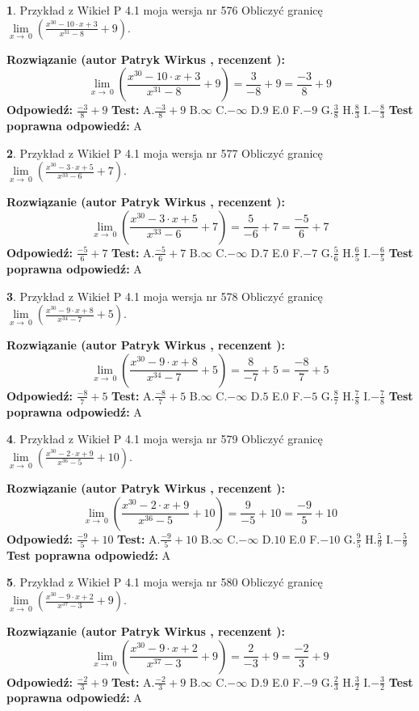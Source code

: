 \documentclass[12pt, a4paper]{article}
\theoremstyle{definition} %
\newtheorem{zad}{}
\newcommand{\zadStart}[1]{\begin{zad}#1\newline}
\newcommand{\zadStop}{\end{zad}}
\newcommand{\rozwStart}[2]{\noindent \textbf{Rozwiązanie (autor #1 , recenzent #2): }\newline}
\newcommand{\rozwStop}{\newline}
\newcommand{\odpStart}{\noindent \textbf{Odpowiedź:}\newline}
\newcommand{\odpStop}{\newline}
\newcommand{\testStart}{\noindent \textbf{Test:}\newline}
\newcommand{\testStop}{\newline}
\newcommand{\kluczStart}{\noindent \textbf{Test poprawna odpowiedź:}\newline}
\newcommand{\kluczStop}{\newline}
\begin{document}
\zadStart{Przykład z Wikieł P 4.1 moja wersja nr 576}
Obliczyć granicę $\lim\limits_{x\to\ 0}(\frac{x^{30}-10 \cdot x +3}{x^{31}-8}+9)$.
\zadStop
\rozwStart{Patryk Wirkus}{}
$$\lim\limits_{x\to\ 0}(\frac{x^{30}-10 \cdot x +3}{x^{31}-8}+9)=\frac{3}{-8}+9=\frac{-3}{8}+9$$
\rozwStop
\odpStart
$\frac{-3}{8}+9$
\odpStop
\testStart
A.$\frac{-3}{8}+9$
B.$\infty$
C.$-\infty$
D.$9$
E.$0$
F.$-9$
G.$\frac{3}{8}$
H.$\frac{8}{3}$
I.$-\frac{8}{3}$
\testStop
\kluczStart
A
\kluczStop



\zadStart{Przykład z Wikieł P 4.1 moja wersja nr 577}
Obliczyć granicę $\lim\limits_{x\to\ 0}(\frac{x^{30}-3 \cdot x +5}{x^{33}-6}+7)$.
\zadStop
\rozwStart{Patryk Wirkus}{}
$$\lim\limits_{x\to\ 0}(\frac{x^{30}-3 \cdot x +5}{x^{33}-6}+7)=\frac{5}{-6}+7=\frac{-5}{6}+7$$
\rozwStop
\odpStart
$\frac{-5}{6}+7$
\odpStop
\testStart
A.$\frac{-5}{6}+7$
B.$\infty$
C.$-\infty$
D.$7$
E.$0$
F.$-7$
G.$\frac{5}{6}$
H.$\frac{6}{5}$
I.$-\frac{6}{5}$
\testStop
\kluczStart
A
\kluczStop



\zadStart{Przykład z Wikieł P 4.1 moja wersja nr 578}
Obliczyć granicę $\lim\limits_{x\to\ 0}(\frac{x^{30}-9 \cdot x +8}{x^{34}-7}+5)$.
\zadStop
\rozwStart{Patryk Wirkus}{}
$$\lim\limits_{x\to\ 0}(\frac{x^{30}-9 \cdot x +8}{x^{34}-7}+5)=\frac{8}{-7}+5=\frac{-8}{7}+5$$
\rozwStop
\odpStart
$\frac{-8}{7}+5$
\odpStop
\testStart
A.$\frac{-8}{7}+5$
B.$\infty$
C.$-\infty$
D.$5$
E.$0$
F.$-5$
G.$\frac{8}{7}$
H.$\frac{7}{8}$
I.$-\frac{7}{8}$
\testStop
\kluczStart
A
\kluczStop



\zadStart{Przykład z Wikieł P 4.1 moja wersja nr 579}
Obliczyć granicę $\lim\limits_{x\to\ 0}(\frac{x^{30}-2 \cdot x +9}{x^{36}-5}+10)$.
\zadStop
\rozwStart{Patryk Wirkus}{}
$$\lim\limits_{x\to\ 0}(\frac{x^{30}-2 \cdot x +9}{x^{36}-5}+10)=\frac{9}{-5}+10=\frac{-9}{5}+10$$
\rozwStop
\odpStart
$\frac{-9}{5}+10$
\odpStop
\testStart
A.$\frac{-9}{5}+10$
B.$\infty$
C.$-\infty$
D.$10$
E.$0$
F.$-10$
G.$\frac{9}{5}$
H.$\frac{5}{9}$
I.$-\frac{5}{9}$
\testStop
\kluczStart
A
\kluczStop



\zadStart{Przykład z Wikieł P 4.1 moja wersja nr 580}
Obliczyć granicę $\lim\limits_{x\to\ 0}(\frac{x^{30}-9 \cdot x +2}{x^{37}-3}+9)$.
\zadStop
\rozwStart{Patryk Wirkus}{}
$$\lim\limits_{x\to\ 0}(\frac{x^{30}-9 \cdot x +2}{x^{37}-3}+9)=\frac{2}{-3}+9=\frac{-2}{3}+9$$
\rozwStop
\odpStart
$\frac{-2}{3}+9$
\odpStop
\testStart
A.$\frac{-2}{3}+9$
B.$\infty$
C.$-\infty$
D.$9$
E.$0$
F.$-9$
G.$\frac{2}{3}$
H.$\frac{3}{2}$
I.$-\frac{3}{2}$
\testStop
\kluczStart
A
\kluczStop
\end{document}
